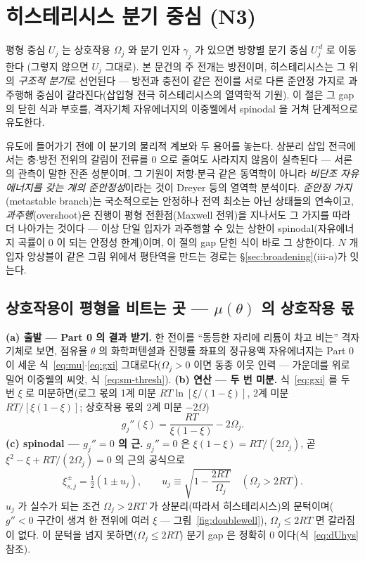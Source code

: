 \section{히스테리시스 분기 중심 (N3)}\label{sec:hys}
평형 중심 $U_j$ 는 상호작용 $\Omega_j$ 와 분기 인자 $\gamma_j$ 가 있으면 방향별 분기 중심 $U_j^{\,d}$ 로 이동한다
(그렇지 않으면 $U_j$ 그대로). 본 문건의 주 전개는 방전이며, 히스테리시스는 그 위의 \emph{구조적 분기}로 선언된다 --- 방전과 충전이
같은 전이를 서로 다른 준안정 가지로 과주행해 중심이 갈라진다(삽입형 전극 히스테리시스의 열역학적 기원\cite{dreyer2010}).
이 절은 그 gap 의 닫힌 식과 부호를, 격자기체 자유에너지의
이중웰에서 spinodal 을 거쳐 단계적으로 유도한다.

유도에 들어가기 전에 이 분기의 물리적 계보와 두 용어를 놓는다. 상분리 삽입 전극에서는 충$\cdot$방전
전위의 갈림이 전류를 $0$ 으로 줄여도 사라지지 않음이 실측된다 --- 서론의 관측이 말한 잔존 성분이며, 그
기원이 저항$\cdot$분극 같은 동역학이 아니라 \emph{비단조 자유에너지를 갖는 계의 준안정성}이라는 것이
Dreyer 등의 열역학 분석이다\cite{dreyer2010,dreyer2011}. \emph{준안정 가지}(metastable branch)는
국소적으로는 안정하나 전역 최소는 아닌 상태들의 연속이고, \emph{과주행}(overshoot)은 진행이 평형
전환점(Maxwell 전위)을 지나서도 그 가지를 따라 더 나아가는 것이다 --- 이상 단일 입자가 과주행할 수 있는
상한이 spinodal(자유에너지 곡률이 $0$ 이 되는 안정성 한계)이며, 이 절의 gap 닫힌 식이 바로 그 상한이다.
$N$ 개 입자 앙상블이 같은 그림 위에서 평탄역을 만드는 경로는 \S\ref{sec:broadening}(iii-a)가 잇는다.

\subsection{상호작용이 평형을 비트는 곳 --- $\mu(\theta)$ 의 상호작용 몫}\label{sec:hys-spinodal}
\textbf{(a) 출발 --- Part 0 의 결과 받기.} 한 전이를 ``동등한 자리에 리튬이 차고 비는'' 격자기체로 보면,
점유율 $\theta$ 의 화학퍼텐셜과 진행률 좌표의 정규용액 자유에너지는 Part 0 이 세운
식~\eqref{eq:mu}$\cdot$\eqref{eq:gxi} 그대로다($\Omega_j>0$ 이면 동종 이웃 인력 --- 가운데를 위로 밀어
이중웰의 씨앗, 식~\eqref{eq:sm-thresh}). \textbf{(b) 연산 --- 두 번 미분.}
식~\eqref{eq:gxi} 를 두 번 $\xi$ 로 미분하면(로그 몫의 1계 미분 $RT\ln[\xi/(1-\xi)]$, 2계 미분
$RT/[\xi(1-\xi)]$; 상호작용 몫의 2계 미분 $-2\Omega$)
\begin{equation}
g_j''(\xi)=\frac{RT}{\xi(1-\xi)}-2\Omega_j.
\label{eq:gpp}
\end{equation}
\textbf{(c) spinodal --- $g_j''=0$ 의 근.} $g_j''=0$ 은 $\xi(1-\xi)=RT/(2\Omega_j)$, 곧 $\xi^2-\xi+RT/(2\Omega_j)=0$
의 근의 공식으로
\begin{equation}
\xi_{s,j}^\pm=\tfrac12(1\pm u_j),\qquad
u_j\equiv\sqrt{1-\frac{2RT}{\Omega_j}}\quad(\Omega_j>2RT).
\label{eq:spinodal}
\end{equation}
$u_j$ 가 실수가 되는 조건 $\Omega_j>2RT$ 가 상분리(따라서 히스테리시스)의 문턱이며($g''<0$ 구간이 생겨 한 전위에 여러
$\xi$ --- 그림~\ref{fig:doublewell}), $\Omega_j\le2RT$ 면 갈라짐이 없다. 이 문턱을 넘지 못하면($\Omega_j\le2RT$) 분기 gap 은 정확히 0 이다(식~\eqref{eq:dUhys} 참조).

